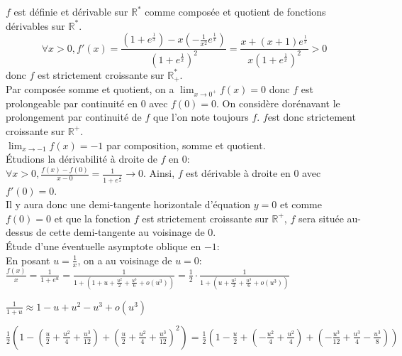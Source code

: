 \begin{Sol}

$f $ est définie et dérivable sur $ \mathbb{R}^* $ comme composée et quotient de fonctions dérivables sur $ \mathbb{R}^*$.\\
$$
\forall x > 0, f'(x) = \frac{(1 + e^{\frac{1}{x}}) - x \left( -\frac{1}{x^2} e^{\frac{1}{x}} \right)}{(1 + e^{\frac{1}{x}})^2} = \frac{x + (x + 1) e^{\frac{1}{x}}}{x (1 + e^{\frac{1}{x}})^2} > 0 $$
donc $ f $ est strictement croissante sur $ \mathbb{R}^*_+$.\\

Par composée somme et quotient, on a $ \lim_{x \to 0^+} f(x) = 0 $ donc $ f $ est prolongeable par continuité en $0 $ avec $f(0) = 0$. On considère dorénavant le prolongement par continuité de $ f$ que l'on note toujours  $f$. $f $est donc strictement croissante sur $ \mathbb{R}^+$.\\

$\lim_{x \to -1} f(x) = -1 $ par composition, somme et quotient.\\

Étudions la dérivabilité à droite de  $f$ en  $0$:\\
$
\forall x > 0, \frac{f(x) - f(0)}{x - 0} = \frac{1}{1 + e^{\frac{1}{x}}} \to 0$.  Ainsi, $ f $ est dérivable à droite en $ 0$  avec  $f'(0) = 0$.\\

Il y aura donc une demi-tangente horizontale d’équation $ y = 0$  et comme $ f(0) = 0$ et que la fonction  $f $ est strictement croissante sur $ \mathbb{R}^+$, $f$ sera située au-dessus de cette demi-tangente au voisinage de $0$.\\

Étude d’une éventuelle asymptote oblique en  $-1$:\\

En posant $ u = \frac{1}{x}$, on a au voisinage de  $u = 0$:\\
$
\frac{f(x)}{x} = \frac{1}{1 + e^u} = \frac{1}{1 + (1 + u + \frac{u^2}{2} + \frac{u^3}{6} + o(u^3))} = \frac{1}{2} \cdot \frac{1}{1 + (u + \frac{u^2}{2} + \frac{u^3}{6} + o(u^3))}
$

$
\frac{1}{1 + u} \approx 1 - u + u^2 - u^3 + o(u^3)
$

$
\frac{1}{2} \left( 1 - \left( \frac{u}{2} + \frac{u^2}{4} + \frac{u^3}{12} \right) + \left( \frac{u}{2} + \frac{u^2}{4} + \frac{u^3}{12} \right)^2 \right) = \frac{1}{2} \left( 1 - \frac{u}{2} + \left( -\frac{u^2}{4} + \frac{u^2}{4} \right) + \left( -\frac{u^3}{12} + \frac{u^3}{4} - \frac{u^3}{8} \right) \right)
$


\end{Sol}

